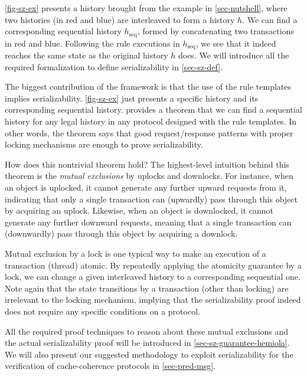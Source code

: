 \autoref{fig-sz-ex} presents a history brought from the example in \autoref{sec-nutshell}, where two histories (in {\color{myred} red} and {\color{myblue} blue}) are interleaved to form a history $h$.
We can find a corresponding sequential history $h_{\textrm{seq}}$, formed by concatenating two transactions in {\color{myred} red} and {\color{myblue} blue}.
Following the rule executions in $h_{\textrm{seq}}$, we see that it indeed reaches the same state as the original history $h$ does.
We will introduce all the required formalization to define serializability in \autoref{sec-sz-def}.

The biggest contribution of the \hemiola{} framework is that the use of the rule templates implies serializability.
\autoref{fig-sz-ex} just presents a specific history and its corresponding sequential history.
\hemiola{} provides a theorem that we can find a sequential history for any legal history in any protocol designed with the rule templates.
In other words, the theorem says that good request/response patterns with proper locking mechanisms are enough to prove serializability.

How does this nontrivial theorem hold?
The highest-level intuition behind this theorem is the \emph{mutual exclusions} by uplocks and downlocks.
For instance, when an object is uplocked, it cannot generate any further upward requests from it, indicating that only a single transaction can (upwardly) pass through this object by acquiring an uplock.
Likewise, when an object is downlocked, it cannot generate any further downward requests, meaning that a single transaction can (downwardly) pass through this object by acquiring a downlock.

Mutual exclusion by a lock is one typical way to make an execution of a transaction (thread) atomic.
By repeatedly applying the atomicity guarantee by a lock, we can change a given interleaved history to a corresponding sequential one.
Note again that the state transitions by a transaction (other than locking) are irrelevant to the locking mechanism, implying that the serializability proof indeed does not require any specific conditions on a protocol.

All the required proof techniques to reason about these mutual exclusions and the actual serializability proof will be introduced in \autoref{sec-sz-guarantee-hemiola}.
We will also present our suggested methodology to exploit serializability for the verification of cache-coherence protocols in \autoref{sec-pred-msg}.

